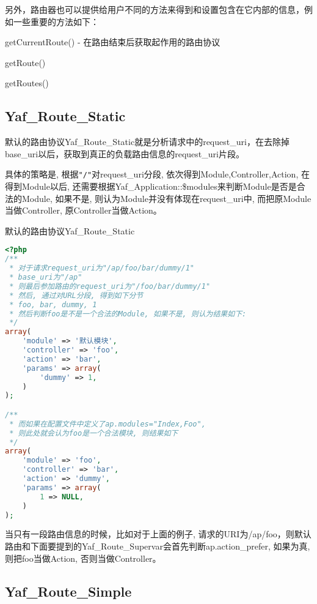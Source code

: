 另外，路由器也可以提供给用户不同的方法来得到和设置包含在它内部的信息，例如一些重要的方法如下：

\begin{compactitem}
\item getCurrentRoute() - 在路由结束后获取起作用的路由协议
\item getRoute()
\item getRoutes()
\end{compactitem}

\subsection{Yaf\_Route\_Static}

默认的路由协议Yaf\_Route\_Static就是分析请求中的request\_uri，在去除掉base\_uri以后，获取到真正的负载路由信息的request\_uri片段。

具体的策略是, 根据\texttt{"/"}对request\_uri分段, 依次得到Module,Controller,Action, 在得到Module以后, 还需要根据Yaf\_Application::\$modules来判断Module是否是合法的Module, 如果不是, 则认为Module并没有体现在request\_uri中, 而把原Module当做Controller, 原Controller当做Action。


\begin{example}
默认的路由协议Yaf\_Route\_Static
\begin{lstlisting}[language=PHP]
<?php
/**
 * 对于请求request_uri为"/ap/foo/bar/dummy/1"
 * base_uri为"/ap"
 * 则最后参加路由的request_uri为"/foo/bar/dummy/1"
 * 然后, 通过对URL分段, 得到如下分节
 * foo, bar, dummy, 1
 * 然后判断foo是不是一个合法的Module, 如果不是, 则认为结果如下:
 */
array(
    'module' => '默认模块',
    'controller' => 'foo',
    'action' => 'bar',
    'params' => array(
        'dummy' => 1,
    )
);

/**
 * 而如果在配置文件中定义了ap.modules="Index,Foo",
 * 则此处就会认为foo是一个合法模块, 则结果如下
 */
array(
    'module' => 'foo',
    'controller' => 'bar',
    'action' => 'dummy',
    'params' => array(
        1 => NULL,
    )
);
\end{lstlisting}
\end{example}

当只有一段路由信息的时候，比如对于上面的例子, 请求的URI为/ap/foo，则默认路由和下面要提到的Yaf\_Route\_Supervar会首先判断ap.action\_prefer, 如果为真, 则把foo当做Action, 否则当做Controller。

\subsection{Yaf\_Route\_Simple}

